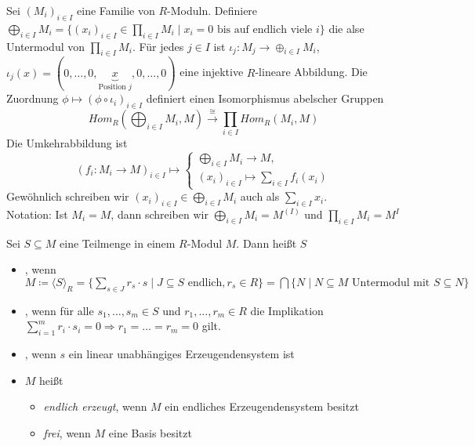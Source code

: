 \documentclass[../main.tex]{subfiles}
\begin{document}
\begin{definition}
    Sei $(M_i)_{i\in I}$ eine Familie von $R$-Moduln. Definiere $\bigoplus_{i\in I} M_i = \{(x_i)_{i\in I}\in \prod_{i\in I} M_i \mid x_i = 0 \text{ bis auf endlich viele $i$}\}$ die  alse Untermodul von $\prod_{i\in I} M_i$.
    Für jedes $j\in I$ ist $\iota_j : M_j \rightarrow \oplus_{i\in I} M_i$, $\iota_j (x) = (0,\dots, 0,\underbrace{x}_{\text{Position $j$}},0,\dots,0)$ eine injektive $R$-lineare Abbildung.
    Die Zuordnung $\phi \mapsto (\phi \circ \iota_i)_{i\in I}$ definiert einen Isomorphismus abelscher Gruppen
    $$Hom_R \left(\bigoplus_{i\in I} M_i,M\right)\overset{\cong}{\rightarrow} \prod_{i\in I} Hom_R(M_i, M)$$
    Die Umkehrabbildung ist 
    $$(f_i: M_i\rightarrow M)_{i\in I} \mapsto \begin{cases}
        \bigoplus_{i\in I} M_i\rightarrow M,\\
        (x_i)_{i\in I} \mapsto \sum_{i\in I} f_i(x_i)
    \end{cases}$$
    Gewöhnlich schreiben wir $(x_i)_{i\in I} \in \bigoplus_{i\in I} M_i$ auch als $\sum_{i\in I} x_i$.\\
    Notation: Ist $M_i = M$, dann schreiben wir $\bigoplus_{i\in I}M_i = M^{(I)}$ und $\prod_{i\in I} M_i = M^I$
\end{definition}

\begin{definition}
    Sei $S\subseteq M$ eine Teilmenge in einem $R$-Modul $M$. Dann heißt $S$
    \begin{itemize}
        \item {}, wenn $M\coloneqq \langle S\rangle_R = \{\sum_{s\in J} r_s\cdot s \mid J\subseteq S \text{ endlich}, r_s\in R\} = \bigcap\{N\mid N\subseteq M\text{ Untermodul mit }S\subseteq N\}$
        \item {}, wenn für alle $s_1,\dots,s_m \in S$ und $r_1,\dots,r_m\in R$ die Implikation $\sum_{i=1}^m r_i\cdot s_i = 0 \Rightarrow r_1 = \dots = r_m = 0$ gilt.
        \item {}, wenn $s$ ein linear unabhängiges Erzeugendensystem ist
        \item $M$ heißt
        \begin{itemize}
            \item \emph{endlich erzeugt}, wenn $M$ ein endliches Erzeugendensystem besitzt
            \item \emph{frei}, wenn $M$ eine Basis besitzt
        \end{itemize}
    \end{itemize}
\end{definition}
\end{document}

